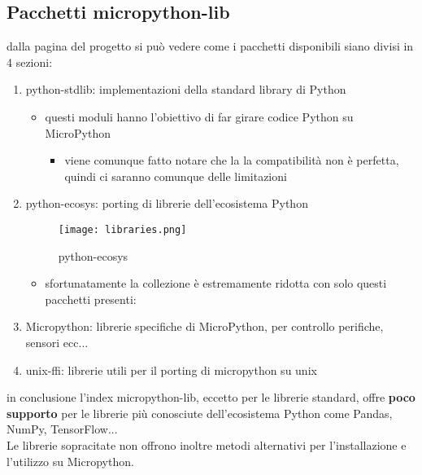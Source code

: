 \documentclass[12pt,a4paper]{report}
\begin{document}
\subsection{Pacchetti micropython-lib}\label{pacchetti-micropython-lib}

dalla pagina del progetto \cite{micropython_lib} si può vedere come i pacchetti disponibili siano divisi in
4 sezioni:

\begin{enumerate}
\item
  python-stdlib: implementazioni della standard library di Python \cite{python_standard_library}

  \begin{itemize}
    \item
    questi moduli hanno l'obiettivo di far girare codice
    Python su MicroPython

    \begin{itemize}
        \item
      viene comunque fatto notare che la la compatibilità non è
      perfetta, quindi ci saranno comunque delle limitazioni
    \end{itemize}
  \end{itemize}
\item
  python-ecosys: porting di librerie dell'ecosistema Python
  \begin{figure}
    \centering
    \texttt{[image: libraries.png]}
    \caption{python-ecosys}
\end{figure}
  \begin{itemize}
    \item
    sfortunatamente la collezione è estremamente ridotta con solo questi
    pacchetti presenti:
    
  \end{itemize}
\item
  Micropython: librerie specifiche di MicroPython, per controllo
  perifiche, sensori ecc...
\item
  unix-ffi: librerie utili per il porting di micropython su unix
\end{enumerate}

in conclusione l'index micropython-lib, eccetto per le
librerie standard, offre \textbf{poco supporto} per le librerie più
conosciute dell'ecosistema Python come Pandas, NumPy,
TensorFlow...\\
Le librerie sopracitate non offrono inoltre metodi alternativi per
l'installazione e l'utilizzo su
Micropython.
\end{document}
